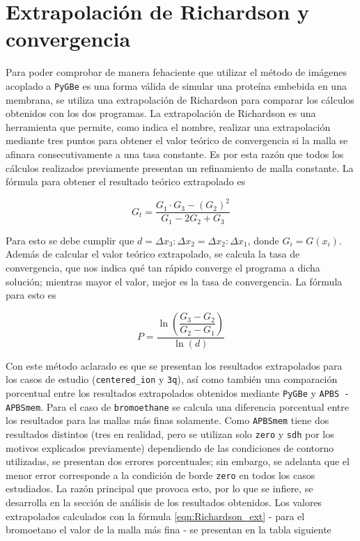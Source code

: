 \documentclass[12pt, oneside, numbers, spanish]{ezthesis}
\numberwithin{equation}{section}
\begin{document}
\section{Extrapolación de Richardson y convergencia}
Para poder comprobar de manera fehaciente que utilizar el método de imágenes acoplado a \texttt{PyGBe} es una forma válida de simular una proteína embebida en una membrana, se utiliza una extrapolación de Richardson para comparar los cálculos obtenidos con los dos programas. La extrapolación de Richardson es una herramienta que permite, como indica el nombre, realizar una extrapolación mediante tres puntos para obtener el valor teórico de convergencia si la malla se afinara consecutivamente a una tasa constante. Es por esta razón que todos los cálculos realizados previamente presentan un refinamiento de malla constante. La fórmula para obtener el resultado teórico extrapolado es

\begin{equation}\label{eqn:Richardson_ext}
G_t = \frac{G_1\cdot G_3 - (G_2)^2}{G_1 - 2G_2 + G_3}
\end{equation}

\noindent
Para esto se debe cumplir que $d = \Delta x_3:\Delta x_2 = \Delta x_2:\Delta x_1$, donde $G_i = G(x_i)$. Además de calcular el valor teórico extrapolado, se calcula la tasa de convergencia, que nos indica qué tan rápido converge el programa a dicha solución; mientras mayor el valor, mejor es la tasa de convergencia. La fórmula para esto es

\begin{equation}\label{eqn:convergence_rating}
	P = \dfrac{\ln{\left(\dfrac{G_3 - G_2}{G_2 - G_1}\right)}}{\ln{(d)}}
\end{equation}

\noindent
Con este método aclarado es que se presentan los resultados extrapolados para los casos de estudio (\texttt{centered\_ion} y \texttt{3q}), así como también una comparación porcentual entre los resultados extrapolados obtenidos mediante \texttt{PyGBe} y \texttt{APBS - APBSmem}. Para el caso de \texttt{bromoethane} se calcula una diferencia porcentual entre los resultados para las mallas más finas solamente. Como \texttt{APBSmem} tiene dos resultados distintos (tres en realidad, pero se utilizan solo \texttt{zero} y \texttt{sdh} por los motivos explicados previamente) dependiendo de las condiciones de contorno utilizadas, se presentan dos errores porcentuales; sin embargo, se adelanta que el menor error corresponde a la condición de borde \texttt{zero} en todos los casos estudiados. La razón principal que provoca esto, por lo que se infiere, se desarrolla en la sección de análisis de los resultados obtenidos. Los valores extrapolados calculados con la fórmula \ref{eqn:Richardson_ext} - para el bromoetano el valor de la malla más fina - se presentan en la tabla siguiente
\end{document}
